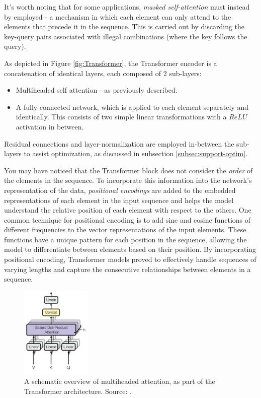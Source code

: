 \documentclass{article}
\begin{document}
\medskip
\noindent
It's worth noting that for some applications, \emph{masked self-attention} must instead by employed - a mechanism in which each element can only attend to the elements that precede it in the sequence. This is carried out by discarding the key-query pairs associated with illegal combinations (where the key follows the query).

\medskip
\noindent
As depicted in Figure \ref{fig:Transformer}, the Transformer encoder is a concatenation of identical layers, each composed of 2 sub-layers:
\begin{itemize}
    \item
        Multiheaded self attention - as previously described.
    \item
        A fully connected network, which is applied to each element separately and identically. This consists of two simple linear transformations with a $ReLU$ activation in between.
\end{itemize}
Residual connections and layer-normalization are employed in-between the sub-layers to assist optimization, as discussed in subsection \ref{subsec:support-optim}.

\medskip
\noindent
You may have noticed that the Transformer block does not consider the \emph{order} of the elements in the sequence. To incorporate this information into the network's representation of the data, \emph{positional encodings} are added to the embedded representations of each element in the input sequence and helps the model understand the relative position of each element with respect to the others. One common technique for positional encoding is to add sine and cosine functions of different frequencies to the vector representations of the input elements. These functions have a unique pattern for each position in the sequence, allowing the model to differentiate between elements based on their position. By incorporating positional encoding, Transformer models proved to effectively handle sequences of varying lengths and capture the consecutive relationships between elements in a sequence.

\begin{figure}
    \centering
    \vspace{-2mm}
    \includegraphics[width=0.3\textwidth]{figures/multi_attn.png}
    \caption{
        A schematic overview of multiheaded attention, as part of the Transformer architecture. Source: \citet{vaswani2017attention}.
    }
    \label{fig:multi_attn}
    \vspace{-8mm}
\end{figure}
\end{document}
